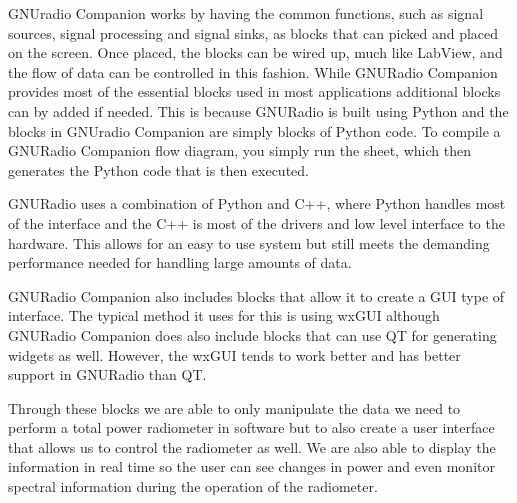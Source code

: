 
GNUradio Companion works by having the common functions, such as signal sources, signal processing and signal sinks, as blocks that can picked and placed on the screen.  Once placed, the blocks can be wired up, much like LabView, and the flow of data can be controlled in this fashion.  While GNURadio Companion provides most of the essential blocks used in most applications additional blocks can by added if needed.  This is because GNURadio is built using Python and the blocks in GNUradio Companion are simply blocks of Python code.  To compile a GNURadio Companion flow diagram, you simply run the sheet, which then generates the Python code that is then executed.  

GNURadio uses a combination of Python and C++, where Python handles most of the interface and the C++ is most of the drivers and low level interface to the hardware.  This allows for an easy to use system but still meets the demanding performance needed for handling large amounts of data.  

GNURadio Companion also includes blocks that allow it to create a GUI type of interface.  The typical method it uses for this is using wxGUI although GNURadio Companion does also include blocks that can use QT for generating widgets as well.  However, the wxGUI tends to work better and has better support in GNURadio than QT.  

Through these blocks we are able to only manipulate the data we need to perform a total power radiometer in software but to also create a user interface that allows us to control the radiometer as well.  We are also able to display the information in real time so the user can see changes in power and even monitor spectral information during the operation of the radiometer. 


